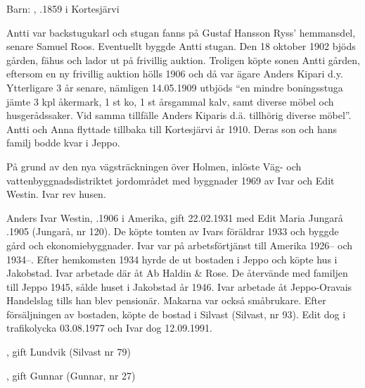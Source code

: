 Barn: , .1859 i Kortesjärvi

Antti var backstugukarl och stugan fanns på Gustaf Hansson Ryss' hemmansdel, senare Samuel Roos. Eventuellt byggde Antti stugan. Den 18 oktober 1902 bjöds gården, fähus och lador ut på frivillig auktion. Troligen köpte sonen Antti gården, eftersom en ny frivillig auktion hölls 1906 och då var ägare Anders Kipari d.y. Ytterligare 3 år senare, nämligen 14.05.1909 utbjöds ``en mindre boningsstuga jämte 3 kpl åkermark, 1 st ko, 1 st årsgammal kalv, samt diverse möbel och husgerådssaker. Vid samma tillfälle Anders Kiparis d.ä. tillhörig diverse möbel''. Antti och Anna flyttade tillbaka till Kortesjärvi år 1910. Deras son och hans familj bodde kvar i Jeppo.






På grund av den nya vägsträckningen över Holmen, inlöste Väg- och vattenbyggnadsdistriktet jordområdet med byggnader 1969 av Ivar och Edit Westin. Ivar rev husen.

Anders Ivar Westin, .1906 i Amerika, gift 22.02.1931 med Edit Maria Jungarå .1905 (Jungarå, nr 120). De köpte tomten av Ivars föräldrar 1933 och byggde gård och ekonomiebyggnader. Ivar var på arbetsförtjänst till Amerika 1926-- och 1934--. Efter hemkomsten 1934 hyrde de ut bostaden i Jeppo och köpte hus i Jakobstad. Ivar arbetade där åt Ab Haldin \& Rose. De återvände  med familjen till Jeppo 1945, sålde huset i Jakobstad år 1946. Ivar arbetade åt Jeppo-Oravais Handelslag tills han blev pensionär. Makarna var också småbrukare. Efter försäljningen av bostaden, köpte de bostad i Silvast (Silvast, nr 93). Edit dog i trafikolycka 03.08.1977 och Ivar dog 12.09.1991.
\begin{jhchildren}
  \item {}, gift Lundvik (Silvast nr 79)
  \item {}, gift Gunnar (Gunnar, nr 27)
\end{jhchildren}






